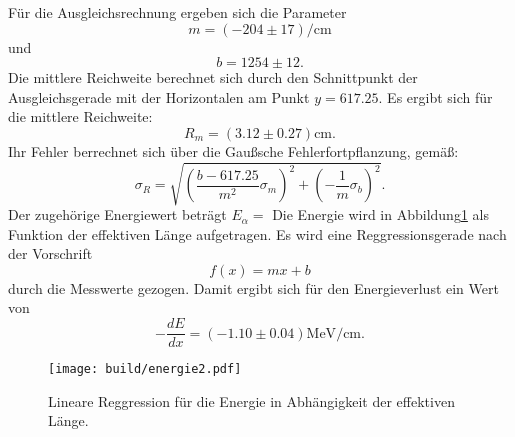 \noindent Für die Ausgleichsrechnung ergeben sich die Parameter
\begin{equation*}
  m =(-204\pm17)\si{\per\centi\meter}
\end{equation*}
und
\begin{equation*}
  b = 1254\pm12   .
\end{equation*}
Die mittlere Reichweite berechnet sich durch den Schnittpunkt der Ausgleichsgerade mit der Horizontalen am Punkt $y=617.25$.
Es ergibt sich für die mittlere Reichweite:
\begin{equation}
  R_m=(3.12\pm0.27)\si{\centi\meter} .
\end{equation}
Ihr Fehler berrechnet sich über die Gaußsche Fehlerfortpflanzung, gemäß:
\begin{equation*}
    \sigma_R = \sqrt{(\frac{b-617.25}{m^2}\sigma_m)^2 +(-\frac{1}{m}\sigma_b)^2} .
\end{equation*}
Der zugehörige Energiewert beträgt $E_{\alpha}=$
Die Energie wird in Abbildung\ref{fig:e2} als Funktion der effektiven Länge aufgetragen.
Es wird eine Reggressionsgerade nach der Vorschrift
\begin{equation*}
  f(x) = mx + b
\end{equation*}
durch die Messwerte gezogen.
Damit ergibt sich für den Energieverlust ein Wert von
\begin{equation*}
  -\frac{dE}{dx} =(-1.10\pm0.04)\si{\mega\electronvolt\per\centi\meter} .
\end{equation*}

\begin{figure}[H]
  \centering
  \texttt{[image: build/energie2.pdf]}
  \caption{Lineare Reggression für die Energie in Abhängigkeit der effektiven Länge.}
  \label{fig:e2}
\end{figure}

